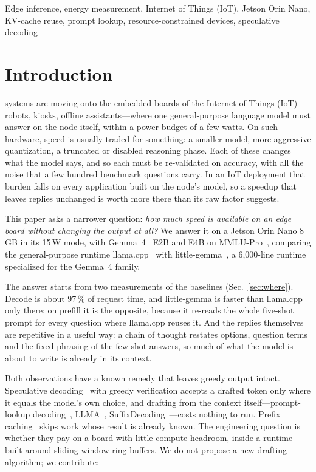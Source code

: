 \documentclass[lettersize,journal]{IEEEtran}
\newcommand{\lc}{llama.cpp}
\newcommand{\lgm}{little-gemma}
\begin{document}
\begin{IEEEkeywords}
Edge inference, energy measurement, Internet of Things (IoT), Jetson Orin Nano, KV-cache reuse, prompt lookup, resource-constrained devices, speculative decoding
\end{IEEEkeywords}

\section{Introduction}

 systems are moving onto the embedded boards of the
Internet of Things (IoT)---robots, kiosks, offline assistants---where one
general-purpose language model must answer on the node itself, within a power
budget of a few watts. On such hardware, speed is usually traded for
something: a smaller model, more aggressive quantization, a truncated or
disabled reasoning phase. Each of these changes what the model says, and so
each must be re-validated on accuracy, with all the noise that a few hundred
benchmark questions carry. In an IoT deployment that burden falls on every
application built on the node's model, so a speedup that leaves replies
unchanged is worth more there than its raw factor suggests.

This paper asks a narrower question: \emph{how much speed is available on an
edge board without changing the output at all?} We answer it on a Jetson Orin
Nano 8\,GB in its 15\,W mode, with Gemma~4~\cite{gemma4} E2B and E4B on
MMLU-Pro~\cite{mmlupro}, comparing the general-purpose runtime \lc{}~\cite{llamacpp}
with \lgm{}~\cite{littlegemma,littlegemmarepo}, a 6,000-line runtime specialized for
the Gemma~4 family.

The answer starts from two measurements of the baselines
(Sec.~\ref{sec:where}). Decode is about 97\,\% of request time, and \lgm{} is
faster than \lc{} only there; on prefill it is the opposite, because it
re-reads the whole five-shot prompt for every question where \lc{} reuses it.
And the replies themselves are repetitive in a useful way: a chain of thought
restates options, question terms and the fixed phrasing of the few-shot
answers, so much of what the model is about to write is already in its context.

Both observations have a known remedy that leaves greedy output intact.
Speculative decoding~\cite{leviathan2023,chen2023} with greedy verification
accepts a drafted token only where it equals the model's own choice, and
drafting from the context itself---prompt-lookup decoding~\cite{pld},
LLMA~\cite{llma}, SuffixDecoding~\cite{suffixdecoding}---costs nothing to run. Prefix caching~\cite{vllm,sglang}
skips work whose result is already known. The engineering question is whether
they pay on a board with little compute headroom, inside a runtime built around
sliding-window ring buffers. We do not propose a new drafting algorithm; we
contribute:
\end{document}
